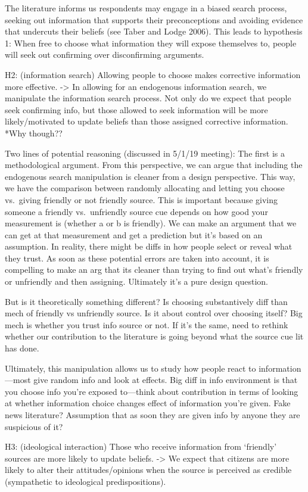 \documentclass[11pt,article,oneside]{memoir}
\begin{document}
The literature informs us respondents may engage in a biased search
process, seeking out information that supports their preconceptions and
avoiding evidence that undercuts their beliefs (see Taber and Lodge
2006). This leads to hypothesis 1: When free to choose what information
they will expose themselves to, people will seek out confirming over
disconfirming arguments.

H2: (information search) Allowing people to choose makes corrective
information more effective. -\textgreater{} In allowing for an
endogenous information search, we manipulate the information search
process. Not only do we expect that people seek confirming info, but
those allowed to seek information will be more likely/motivated to
update beliefs than those assigned corrective information. *Why though??

Two lines of potential reasoning (discussed in 5/1/19 meeting): The
first is a methodological argument. From this perspective, we can argue
that including the endogenous search manipulation is cleaner from a
design perspective. This way, we have the comparison between randomly
allocating and letting you choose vs.~giving friendly or not friendly
source. This is important because giving someone a friendly
vs.~unfriendly source cue depends on how good your measurement is
(whether a or b is friendly). We can make an argument that we can get at
that measurement and get a prediction but it's based on an assumption.
In reality, there might be diffs in how people select or reveal what
they trust. As soon as these potential errors are taken into account, it
is compelling to make an arg that its cleaner than trying to find out
what's friendly or unfriendly and then assigning. Ultimately it's a pure
design question.

But is it theoretically something different? Is choosing substantively
diff than mech of friendly vs unfriendly source. Is it about control
over choosing itself? Big mech is whether you trust info source or not.
If it's the same, need to rethink whether our contribution to the
literature is going beyond what the source cue lit has done.

Ultimately, this manipulation allows us to study how people react to
information---most give random info and look at effects. Big diff in
info environment is that you choose info you're exposed to---think about
contribution in terms of looking at whether information choice changes
effect of information you're given. Fake news literature? Assumption
that as soon they are given info by anyone they are suspicious of it?

H3: (ideological interaction) Those who receive information from
`friendly' sources are more likely to update beliefs. -\textgreater{} We
expect that citizens are more likely to alter their attitudes/opinions
when the source is perceived as credible (sympathetic to ideological
predispositions).

\printbibliography[heading=subbibliography, title=References]
\end{document}
